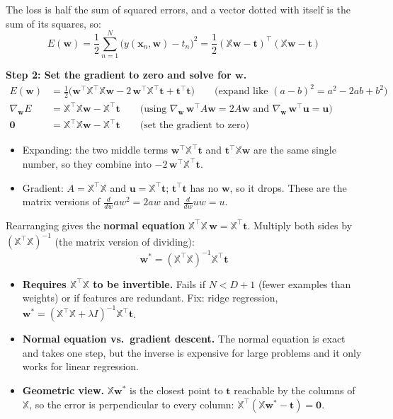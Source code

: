 The loss is half the sum of squared errors, and a vector dotted with itself is the sum of its squares, so:
\[
E(\mathbf{w}) = \frac12\sum_{n=1}^{N}\big(y(\mathbf{x}_n,\mathbf{w}) - t_n\big)^2 = \frac12(\mathbb{X}\mathbf{w} - \mathbf{t})^\top(\mathbb{X}\mathbf{w} - \mathbf{t})
\]

\textbf{Step 2: Set the gradient to zero and solve for $\mathbf{w}$.}
\begin{align*}
E(\mathbf{w})
&= \frac12\big(\mathbf{w}^\top\mathbb{X}^\top\mathbb{X}\mathbf{w} - 2\,\mathbf{w}^\top\mathbb{X}^\top\mathbf{t} + \mathbf{t}^\top\mathbf{t}\big)
  \qquad \text{(expand like $(a-b)^2 = a^2 - 2ab + b^2$)} \\
\nabla_{\mathbf{w}} E
&= \mathbb{X}^\top\mathbb{X}\mathbf{w} - \mathbb{X}^\top\mathbf{t}
  \qquad \text{(using $\nabla_{\mathbf{w}}\, \mathbf{w}^\top A\mathbf{w} = 2A\mathbf{w}$ and $\nabla_{\mathbf{w}}\, \mathbf{w}^\top\mathbf{u} = \mathbf{u}$)} \\
\mathbf{0}
&= \mathbb{X}^\top\mathbb{X}\mathbf{w} - \mathbb{X}^\top\mathbf{t}
  \qquad \text{(set the gradient to zero)}
\end{align*}
\begin{itemize}
  \item Expanding: the two middle terms $\mathbf{w}^\top\mathbb{X}^\top\mathbf{t}$ and $\mathbf{t}^\top\mathbb{X}\mathbf{w}$ are the same single number, so they combine into $-2\,\mathbf{w}^\top\mathbb{X}^\top\mathbf{t}$.
  \item Gradient: $A = \mathbb{X}^\top\mathbb{X}$ and $\mathbf{u} = \mathbb{X}^\top\mathbf{t}$; $\mathbf{t}^\top\mathbf{t}$ has no $\mathbf{w}$, so it drops. These are the matrix versions of $\tfrac{d}{dw}aw^2 = 2aw$ and $\tfrac{d}{dw}uw = u$.
\end{itemize}
Rearranging gives the \textbf{normal equation} $\mathbb{X}^\top\mathbb{X}\,\mathbf{w} = \mathbb{X}^\top\mathbf{t}$. Multiply both sides by $(\mathbb{X}^\top\mathbb{X})^{-1}$ (the matrix version of dividing):
\[
\mathbf{w}^* = (\mathbb{X}^\top\mathbb{X})^{-1}\mathbb{X}^\top\mathbf{t}
\]

\begin{itemize}
  \item \textbf{Requires $\mathbb{X}^\top\mathbb{X}$ to be invertible.} Fails if $N < D+1$ (fewer examples than weights) or if features are redundant. Fix: ridge regression, $\mathbf{w}^* = (\mathbb{X}^\top\mathbb{X} + \lambda I)^{-1}\mathbb{X}^\top\mathbf{t}$.
  \item \textbf{Normal equation vs.\ gradient descent.} The normal equation is exact and takes one step, but the inverse is expensive for large problems and it only works for linear regression.
  \item \textbf{Geometric view.} $\mathbb{X}\mathbf{w}^*$ is the closest point to $\mathbf{t}$ reachable by the columns of $\mathbb{X}$, so the error is perpendicular to every column: $\mathbb{X}^\top(\mathbb{X}\mathbf{w}^* - \mathbf{t}) = \mathbf{0}$.
\end{itemize}
